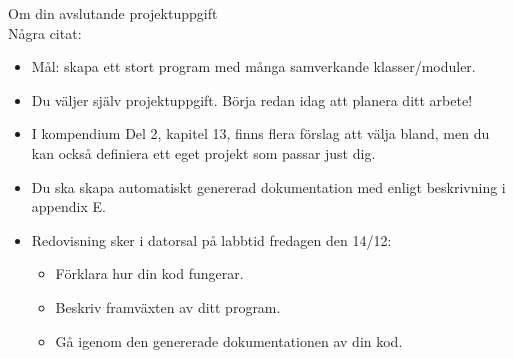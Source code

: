 


\ifkompendium\else


\begin{SlideExtra}{Om din avslutande projektuppgift}\SlideFontSmall
{} \\
Några citat:
\begin{itemize}
\item Mål: skapa ett stort program med många samverkande klasser/moduler.
\item Du väljer själv projektuppgift. Börja redan idag att planera ditt arbete!

\item I kompendium Del 2, kapitel 13, finns flera förslag att välja bland, men du kan också definiera ett eget projekt som passar just dig.


\item Du ska skapa automatiskt genererad dokumentation med  enligt beskrivning i appendix E.

\item Redovisning sker i datorsal på labbtid fredagen den 14/12:
\begin{itemize}\SlideFontTiny
  \item Förklara hur din kod fungerar.
  \item Beskriv framväxten av ditt program.
  \item Gå igenom den genererade dokumentationen av din kod.
\end{itemize}
\end{itemize}

\end{SlideExtra}


